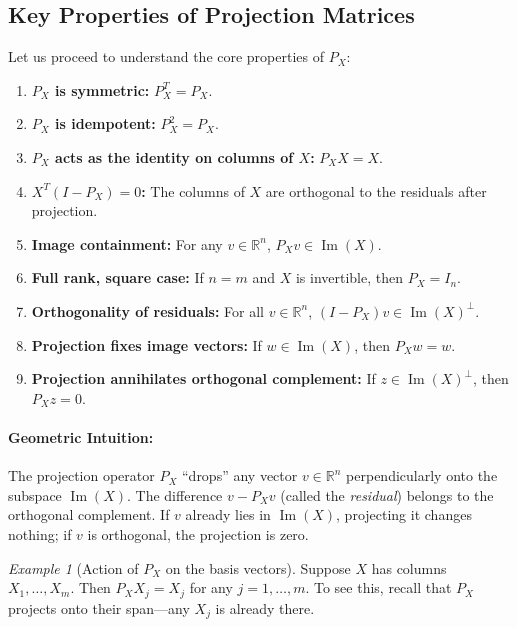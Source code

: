 \documentclass[12pt]{article}
\theoremstyle{definition}
\theoremstyle{plain}
\theoremstyle{remark}
\newtheorem{example}[definition]{Example}
\begin{document}
\subsection{Key Properties of Projection Matrices}

Let us proceed to understand the core properties of $P_X$:

\begin{enumerate}[label=\textbf{Property \arabic*:}, leftmargin=3.6em]
    \item \textbf{$P_X$ is symmetric:} $P_X^T = P_X$.
    \item \textbf{$P_X$ is idempotent:} $P_X^2 = P_X$.
    \item \textbf{$P_X$ acts as the identity on columns of $X$:} $P_X X = X$.
    \item \textbf{$X^T (I - P_X) = 0$:} The columns of $X$ are orthogonal to the residuals after projection.
    \item \textbf{Image containment:} For any $v \in \mathbb{R}^n$, $P_X v \in \operatorname{Im}(X)$.
    \item \textbf{Full rank, square case:} If $n = m$ and $X$ is invertible, then $P_X = I_n$.
    \item \textbf{Orthogonality of residuals:} For all $v \in \mathbb{R}^n$, $(I - P_X)v \in \operatorname{Im}(X)^\perp$.
    \item \textbf{Projection fixes image vectors:} If $w \in \operatorname{Im}(X)$, then $P_X w = w$.
    \item \textbf{Projection annihilates orthogonal complement:} If $z \in \operatorname{Im}(X)^\perp$, then $P_X z = 0$.
\end{enumerate}

\vspace{-1.2em}
\paragraph{Geometric Intuition:}
The projection operator $P_X$ ``drops'' any vector $v \in \mathbb{R}^n$ perpendicularly onto the subspace $\operatorname{Im}(X)$. The difference $v - P_X v$ (called the \emph{residual}) belongs to the orthogonal complement. If $v$ already lies in $\operatorname{Im}(X)$, projecting it changes nothing; if $v$ is orthogonal, the projection is zero.

\begin{example}[Action of $P_X$ on the basis vectors]
    Suppose $X$ has columns $X_1, \ldots, X_m$. Then $P_X X_j = X_j$ for any $j=1,\ldots,m$. To see this, recall that $P_X$ projects onto their span---any $X_j$ is already there.
\end{example}
\end{document}
